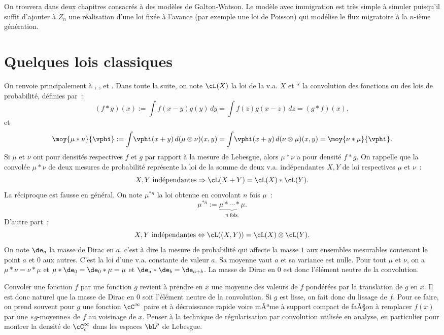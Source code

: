 {{On trouvera dans \cite{ruget} deux chapitres consacrés à des modèles
de Galton-Watson. Le modèle avec immigration est très simple à simuler
puisqu'il suffit d'ajouter à $Z_n$ une réalisation d'une loi fixée à
l'avance (par exemple une loi de Poisson) qui modélise le flux
migratoire à la $n$-ième génération.

%
%
\chapter{Quelques lois classiques}
%
%

On renvoie principalement à \cite{borkar}, \cite{rudin}, \cite{bouleau} et
\cite{dacunha-castelle-duflo}. Dans toute la suite, on note $\cL(X)$ la loi de
la v.a. $X$ et $*$ la convolution des fonctions ou des lois de probabilité,
définies par~:
$$
(f*g)(x):=\int\!f(x-y)g(y)\,dy=\int\!f(z)g(x-z)\,dz=(g*f)(x),
$$
et
$$
\moy{\mu*\nu}{\vphi} :=\int\!\vphi(x+y)\,d(\mu\otimes\nu)(x,y)
=\int\!\vphi(x+y)\,d(\nu\otimes\mu)(x,y)=\moy{\nu*\mu}{\vphi}.
$$
Si $\mu$ et $\nu$ ont pour densités respectives $f$ et $g$ par rapport à la
mesure de Lebesgue, alors $\mu*\nu$ a pour densité $f*g$. On rappelle que la
convolée $\mu*\nu$ de deux mesures de probabilité représente la loi de la
somme de deux v.a. indépendantes $X,Y$ de loi respectives $\mu$ et $\nu$~:
$$
X,Y \text{ indépendantes} \Rightarrow \cL(X+Y)=\cL(X) * \cL(Y).
$$
La réciproque est fausse en général. On note $\mu^{*n}$ la loi obtenue en
convolant $n$ fois $\mu$~:
$$
\mu^{*n}:=\underbrace{\mu* \cdots * \mu}_{n \text{ fois.}}.
$$
D'autre part~:
$$
X,Y \text{ indépendantes} \Leftrightarrow \cL((X,Y))=\cL(X)\otimes\cL(Y).
$$
On note $\de_a$ la masse de Dirac en $a$, c'est à dire la mesure de
probabilité qui affecte la masse $1$ aux ensembles mesurables contenant le
point $a$ et $0$ aux autres. C'est la loi d'une v.a. constante de valeur $a$.
Sa moyenne vaut $a$ et sa variance est nulle. Pour tout $\mu$ et $\nu$, on a
$\mu*\nu=\nu*\mu$ et $\mu*\de_0=\de_0*\mu=\mu$ et $\de_a*\de_b=\de_{a+b}$. La
masse de Dirac en $0$ est donc l'élément neutre de la convolution.

\begin{eur}[Convolution = lissage]
  Convoler une fonction $f$ par une fonction $g$ revient à prendre en $x$ une
  moyenne des valeurs de $f$ pondérées par la translation de $g$ en $x$. Il
  est donc naturel que la masse de Dirac en $0$ soit l'élément neutre de la
  convolution. Si $g$ est lisse, on fait donc du lissage de $f$. Pour ce
  faire, on prend souvent pour $g$ une fonction $\cC^\infty$ paire et à
  décroissance rapide voire mÃªme à support compact de faÃ§on à remplacer $f(x)$
  par une «$g$-moyenne» de $f$ au voisinage de $x$.  Penser à la technique de
  régularisation par convolution utilisée en analyse, en particulier pour
  montrer la densité de $\cC^\infty_c$ dans les espaces $\bL^p$ de Lebesgue.
\end{eur}

}}
